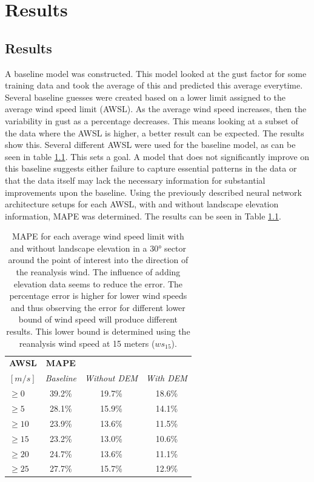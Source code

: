 \chapter{Results}
\label{Chapter5}
\section{Results}
A baseline model was constructed. This model looked at the gust factor for some training data and took the average of this and predicted this average everytime. Several baseline guesses were created based on a lower limit assigned to the average wind speed limit (AWSL). As the average wind speed increases, then the variability in gust as a percentage decreases\cite{mean_gust_HA_HO}. This means looking at a subset of the data where the AWSL is higher, a better result can be expected. The results show this. Several different AWSL were used for the baseline model, as can be seen in table \ref{table:results}. This sets a goal. A model that does not significantly improve on this baseline suggests either failure to capture essential patterns in the data or that the data itself may lack the necessary information for substantial improvements upon the baseline. Using the previously described neural network architecture setups for each AWSL, with and without landscape elevation information, MAPE was determined. The results can be seen in Table \ref{table:results}.

\begin{table}[h]
    \caption[Model results for different AWSL]{MAPE for each average wind speed limit with and without landscape elevation in a 30° sector around the point of interest into the direction of the reanalysis wind. The influence of adding elevation data seems to reduce the error. The percentage error is higher for lower wind speeds and thus observing the error for different lower bound of wind speed will produce different results. This lower bound is determined using the reanalysis wind speed at 15 meters ($ws_{15}$).}
    \label{table:results}
    \centering
    \begin{tabular}{lccc}
        \toprule
        \textbf{AWSL} & \textbf{MAPE} & &\\ 
        $[m/s]$ & \textit{Baseline} &  \textit{Without DEM} & \textit{With DEM} \\
        \midrule
        $\geq 0$ & 39.2\% & 19.7\% & 18.6\% \\
        $\geq 5$ & 28.1\% & 15.9\% & 14.1\%\\
        $\geq 10$ & 23.9\% & 13.6\% & 11.5\%\\
        $\geq 15$ & 23.2\% & 13.0\% & 10.6\%\\
        $\geq 20$ & 24.7\% & 13.6\% & 11.1\%\\
        $\geq 25$ & 27.7\% & 15.7\% & 12.9\%\\
        \bottomrule
    \end{tabular}
\end{table}

